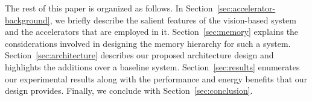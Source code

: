 The rest of this paper is organized as follows.
In Section~\ref{sec:accelerator-background}, we briefly describe the salient features of the vision-based system and the accelerators that are employed in it. 
Section~\ref{sec:memory} explains the considerations involved in designing the memory hierarchy for such a system.
Section~\ref{sec:architecture} describes our proposed architecture design and highlights the additions over a baseline system.
Section~\ref{sec:results} enumerates our experimental results along with the performance and energy benefits that our design provides. Finally, we conclude with Section~\ref{sec:conclusion}.


